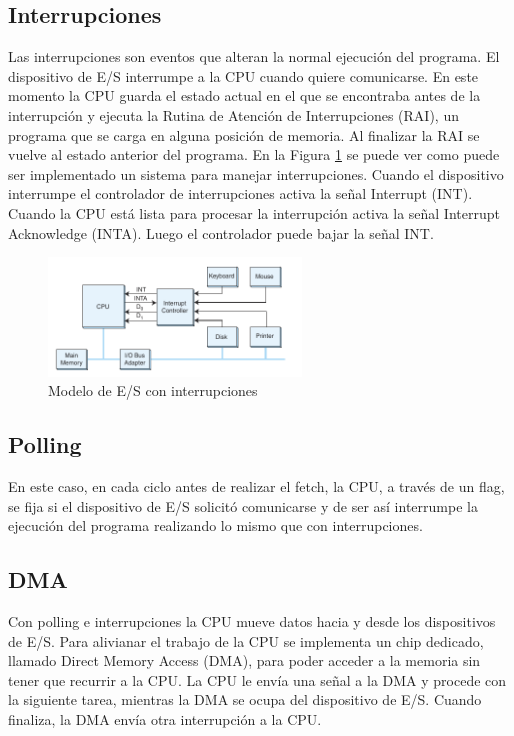 \documentclass[a4paper,12pt]{article}
\begin{document}
\subsection{Interrupciones}
Las interrupciones son eventos que alteran la normal ejecución del programa. El dispositivo de E/S interrumpe a la CPU
cuando quiere comunicarse. En este momento la CPU guarda el estado actual en el que se encontraba antes de la
interrupción y ejecuta la Rutina de Atención de Interrupciones (RAI), un programa que se carga en alguna posición de
memoria. Al finalizar la RAI se vuelve al estado anterior del programa. En la Figura \ref{INTR} se puede ver como puede ser
implementado un sistema para manejar interrupciones. Cuando el dispositivo interrumpe el controlador de interrupciones
activa la señal Interrupt (INT). Cuando la CPU está lista para procesar la interrupción activa la señal Interrupt
Acknowledge (INTA). Luego el controlador puede bajar la señal INT.
\begin{figure}[ht!]
  \centering
   \includegraphics[width=0.6\textwidth]{Imagenes/INTR.png}
  \caption{Modelo de E/S con interrupciones}
  \label{INTR}
\end{figure}

\subsection{Polling}
En este caso, en cada ciclo antes de realizar el fetch, la CPU, a través de un flag, se fija si el dispositivo de E/S
solicitó comunicarse y de ser así interrumpe la ejecución del programa realizando lo mismo que con interrupciones.

\subsection{DMA}
Con polling e interrupciones la CPU mueve datos hacia y desde los dispositivos de E/S. Para alivianar el trabajo de la
CPU se implementa un chip dedicado, llamado Direct Memory Access (DMA), para poder acceder a la memoria sin tener que
recurrir a la CPU. La CPU le envía una señal a la DMA y procede con la siguiente tarea, mientras la DMA se ocupa del
dispositivo de E/S. Cuando finaliza, la DMA envía otra interrupción a la CPU.
\end{document}
